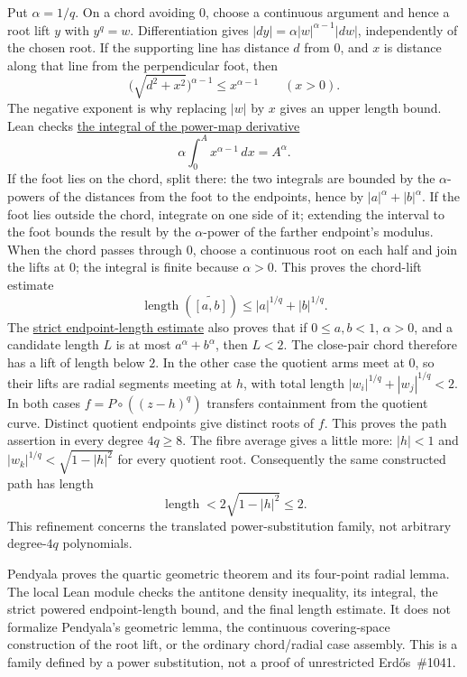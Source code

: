 Put $\alpha=1/q$. On a chord avoiding $0$, choose a continuous
argument and hence a root lift $y$ with $y^q=w$. Differentiation gives
$|dy|=\alpha|w|^{\alpha-1}|dw|$, independently of the chosen root.
If the supporting line has distance $d$ from $0$, and $x$ is distance
along that line from the perpendicular foot, then
\[
  \bigl(\sqrt{d^2+x^2}\bigr)^{\alpha-1}
    \le x^{\alpha-1}\qquad(x>0).
\]
The negative exponent is why replacing $|w|$ by $x$ gives an upper
length bound. Lean checks \href{\repobase/research_corpus/Erdos1041/QuarticQuotientFiberCase.lean\#L37}{the integral of the power-map derivative}
\[
  \alpha\int_0^A x^{\alpha-1}\,dx=A^\alpha.
\]
If the foot lies on the chord, split there: the two
integrals are bounded by the $\alpha$-powers of the distances from the
foot to the endpoints, hence by $|a|^\alpha+|b|^\alpha$. If the foot
lies outside the chord, integrate on one side of it; extending the
interval to the foot bounds the result by the $\alpha$-power of the
farther endpoint's modulus. When the chord passes through $0$, choose
a continuous root on each half and join the lifts at $0$; the integral
is finite because $\alpha>0$. This proves the chord-lift estimate
\[
  \operatorname{length}(\widetilde{[a,b]})
    \le |a|^{1/q}+|b|^{1/q}.
\]
The \href{\repobase/research_corpus/Erdos1041/QuarticQuotientFiberCase.lean\#L59}{strict endpoint-length estimate} also proves that if
$0\le a,b<1$, $\alpha>0$, and a candidate length $L$ is at most
$a^\alpha+b^\alpha$, then $L<2$.  The close-pair chord therefore has a lift of length below $2$.
In the other case the quotient arms meet at $0$, so their lifts are radial
segments meeting at $h$, with total length
$|w_i|^{1/q}+|w_j|^{1/q}<2$. In both cases $f=P\circ((z-h)^q)$
transfers containment from the quotient curve. Distinct quotient endpoints
give distinct roots of $f$. This proves the path assertion in every degree
$4q\ge8$. The fibre average gives a little more: $|h|<1$ and
$|w_k|^{1/q}<\sqrt{1-|h|^2}$ for every quotient root. Consequently the same
constructed path has length
\[
 \operatorname{length}<2\sqrt{1-|h|^2}\le2.
\]
This refinement concerns the translated power-substitution family, not
arbitrary degree-$4q$ polynomials.

Pendyala proves the quartic geometric theorem and its four-point radial
lemma.  The local Lean module
checks the antitone density inequality, its integral, the strict powered
endpoint-length bound, and the final length estimate.  It does not formalize
Pendyala's geometric lemma, the continuous covering-space construction of the
root lift, or the ordinary chord/radial case assembly.  This is a family defined by a power substitution, not a proof of unrestricted Erd\H{o}s~\#1041.

